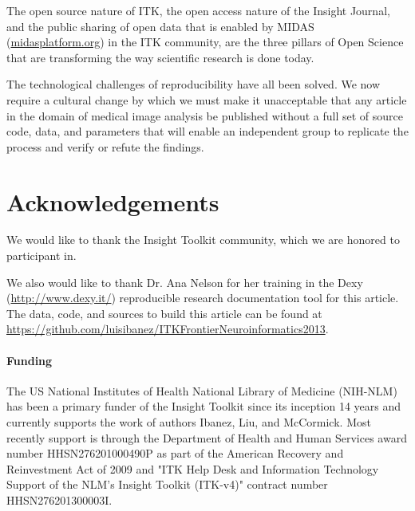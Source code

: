 \documentclass{frontiersENG} %
\begin{document}
The open source nature of ITK, the open access nature of the Insight Journal,
and the public sharing of open data that is enabled by MIDAS
(\url{midasplatform.org}) in the ITK community, are the three pillars of Open
Science that are transforming the way scientific research is done today.

The technological challenges of reproducibility have all been solved. We now
require a cultural change by which we must make it unacceptable that any
article in the domain of medical image analysis be published without a full
set of source code, data, and parameters that will enable an independent group
to replicate the process and verify or refute the findings.

\section*{Acknowledgements}

We would like to thank the Insight Toolkit community, which we are honored to
participant in. 

We also would like to thank Dr. Ana Nelson for her training in the Dexy
(\url{http://www.dexy.it/}) reproducible research documentation tool for this
article.  The data, code, and sources to build this article can be found at
\url{https://github.com/luisibanez/ITKFrontierNeuroinformatics2013}.

\paragraph{Funding\textcolon} The US National Institutes of Health National
Library of Medicine (NIH-NLM) has been a primary funder of the Insight Toolkit since
its inception 14 years and currently supports the work of authors Ibanez, Liu,
and McCormick. Most recently support is through the Department of Health and Human
Services award number HHSN276201000490P as part of the American Recovery and
Reinvestment Act of 2009 and "ITK Help Desk and Information Technology Support
of the NLM's Insight Toolkit (ITK-v4)" contract number HHSN276201300003I.















\end{document}
